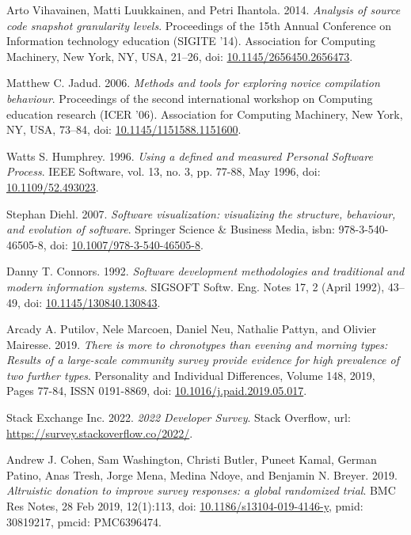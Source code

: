 \begin{thebibliography}{99}
 Arto Vihavainen, Matti Luukkainen, and Petri Ihantola. 2014. \textit{Analysis of source code snapshot granularity levels}. Proceedings of the 15th Annual Conference on Information technology education (SIGITE '14). Association for Computing Machinery, New York, NY, USA, 21–26, doi: \href{https://doi.org/10.1145/2656450.2656473}{10.1145/2656450.2656473}.

 Matthew C. Jadud. 2006. \textit{Methods and tools for exploring novice compilation behaviour}. Proceedings of the second international workshop on Computing education research (ICER '06). Association for Computing Machinery, New York, NY, USA, 73–84, doi: \href{https://doi.org/10.1145/1151588.1151600}{10.1145/1151588.1151600}.

 Watts S. Humphrey. 1996. \textit{Using a defined and measured Personal Software Process}. IEEE Software, vol. 13, no. 3, pp. 77-88, May 1996, doi: \href{https://doi.org/10.1109/52.493023}{10.1109/52.493023}.

 Stephan Diehl. 2007. \textit{Software visualization: visualizing the structure, behaviour, and evolution of software}. Springer Science \& Business Media, isbn: 978-3-540-46505-8, doi: \href{https://doi.org/10.1007/978-3-540-46505-8}{10.1007/978-3-540-46505-8}.

 Danny T. Connors. 1992. \textit{Software development methodologies and traditional and modern information systems}. SIGSOFT Softw. Eng. Notes 17, 2 (April 1992), 43–49, doi: \href{https://doi.org/10.1145/130840.130843}{10.1145/130840.130843}.

 Arcady A. Putilov, Nele Marcoen, Daniel Neu, Nathalie Pattyn, and Olivier Mairesse. 2019. \textit{There is more to chronotypes than evening and morning types: Results of a large-scale community survey provide evidence for high prevalence of two further types}. Personality and Individual Differences, Volume 148, 2019, Pages 77-84, ISSN 0191-8869, doi: \href{https://doi.org/10.1016/j.paid.2019.05.017}{10.1016/j.paid.2019.05.017}.

 Stack Exchange Inc. 2022. \textit{2022 Developer Survey}. Stack Overflow, url: \url{https://survey.stackoverflow.co/2022/}.

 Andrew J. Cohen, Sam Washington, Christi Butler, Puneet Kamal, German Patino, Anas Tresh, Jorge Mena, Medina Ndoye, and Benjamin N. Breyer. 2019. \textit{Altruistic donation to improve survey responses: a global randomized trial}. BMC Res Notes, 28 Feb 2019, 12(1):113, doi: \href{https://doi.org/10.1186/s13104-019-4146-y}{10.1186/s13104-019-4146-y}, pmid: 30819217, pmcid: PMC6396474.


\end{thebibliography}
